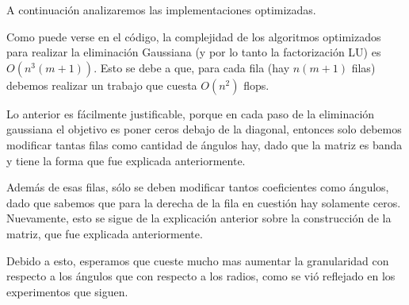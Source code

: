 A continuación analizaremos las implementaciones optimizadas.

Como puede verse en el código, la complejidad de los algoritmos optimizados para realizar la eliminación Gaussiana (y por lo tanto la factorización LU) es $O(n^3 (m+1))$. Esto se debe a que, para cada fila (hay $n(m+1)$ filas) debemos realizar un trabajo que cuesta $O(n^2)$ flops.

Lo anterior es fácilmente justificable, porque en cada paso de la eliminación gaussiana el objetivo es poner ceros debajo de la diagonal, entonces solo debemos modificar tantas filas como cantidad de ángulos hay, dado que la matriz es banda y tiene la forma que fue explicada anteriormente.

Además de esas filas, sólo se deben modificar tantos coeficientes como ángulos, dado que sabemos que para la derecha de la fila en cuestión hay solamente ceros. Nuevamente, esto se sigue de la explicación anterior sobre la construcción de la matriz, que fue explicada anteriormente.

Debido a esto, esperamos que cueste mucho mas aumentar la granularidad con respecto a los ángulos que con respecto a los radios, como se vió reflejado en los experimentos que siguen.


